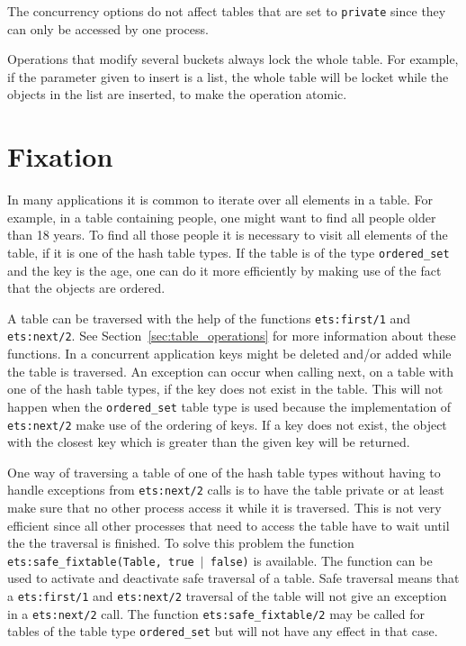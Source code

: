 \documentclass[aps,pre,preprint,nofootinbib]{revtex4}
\begin{document}
The concurrency options do not affect tables that are set to \verb|private| since they can only be accessed by one process.

Operations that modify several buckets always lock the whole table.
For example, if the parameter given to insert is a list, the whole table will be locket while the objects in the list are inserted, to make the operation atomic.

\section{Fixation}
\label{sec:fixation}

In many applications it is common to iterate over all elements in a table.
For example, in a table containing people, one might want to find all people older than 18 years.
To find all those people it is necessary to visit all elements of the table, if it is one of the hash table types.
If the table is of the type \verb|ordered_set| and the key is the age, one can do it more efficiently by making use of the fact that the objects are ordered.

A table can be traversed with the help of the functions \verb|ets:first/1| and \verb|ets:next/2|.
See Section~\ref{sec:table_operations} for more information about these functions.
In a concurrent application keys might be deleted and/or added while the table is traversed.
An exception can occur when calling next, on a table with one of the hash table types, if the key does not exist in the table.
This will not happen when the \verb|ordered_set| table type is used because the implementation of  \verb|ets:next/2| make use of the ordering of keys.
If a key does not exist, the object with the closest key which is greater than the given key will be returned.

One way of traversing a table of one of the hash table types without having to handle exceptions from \verb|ets:next/2| calls is to have the table private or at least make sure that no other process access it while it is traversed.
This is not very efficient since all other processes that need to access the table have to wait until the the traversal is finished.
To solve this problem the function \texttt{ets:safe\_fixtable(Table, true $|$ false)} is available.
The function can be used to activate and deactivate safe traversal of a table. 
Safe traversal means that a \verb|ets:first/1| and \verb|ets:next/2| traversal of the table will not give an exception in a \verb|ets:next/2| call.
The function \verb|ets:safe_fixtable/2| may be called for tables of the table type \verb|ordered_set| but will not have any effect in that case.
\end{document}
